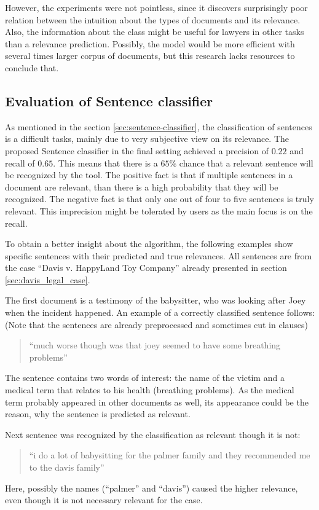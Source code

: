 \documentclass[
  digital, %
  notable,   %
  nolof,     %
  nolot,     %
]{fithesis3}
\begin{document}
However, the experiments were not pointless, since it discovers surprisingly poor relation between the intuition about the types of documents and its relevance.
Also, the information about the class might be useful for lawyers in other tasks than a relevance prediction.
Possibly, the model would be more efficient with several times larger corpus of documents, but this research lacks resources to conclude that.

\subsection{Evaluation of Sentence classifier}
As mentioned in the section \ref{sec:sentence-classifier}, the classification of sentences is a difficult tasks, mainly due to very subjective view on its relevance.
The proposed Sentence classifier in the final setting achieved a precision of $0.22$ and recall of $0.65$.
This means that there is a $65\%$ chance that a relevant sentence will be recognized by the tool.
The positive fact is that if multiple sentences in a document are relevant, than there is a high probability that they will be recognized.
The negative fact is that only one out of four to five sentences is truly relevant.
This imprecision might be tolerated by users as the main focus is on the recall.

To obtain a better insight about the algorithm, the following examples show specific sentences with their predicted and true relevances.
All sentences are from the case ``Davis v. HappyLand Toy Company'' already presented in section \ref{sec:davis_legal_case}.

The first document is a testimony of the babysitter, who was looking after Joey when the incident happened.
An example of a correctly classified sentence follows:
(Note that the sentences are already preprocessed and sometimes cut in clauses)
\begin{quote}
``much worse though was that joey seemed to have some breathing problems''
\end{quote}
The sentence contains two words of interest: the name of the victim and a medical term that relates to his health (breathing problems).
As the medical term probably appeared in other documents as well, its appearance could be the reason, why the sentence is predicted as relevant.

Next sentence was recognized by the classification as relevant though it is not:
\begin{quote}
``i do a lot of babysitting for the palmer family and they recommended me to the davis family''
\end{quote}
Here, possibly the names (``palmer'' and ``davis'') caused the higher relevance, even though it is not necessary relevant for the case.
\end{document}
